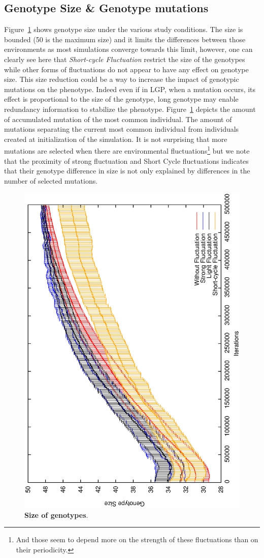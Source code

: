 \subsection{Genotype Size \& Genotype mutations}
Figure~\ref{fig:Size} shows genotype size under the various study conditions. The size is bounded (50 is the maximum size) and it limits the differences between those environments as most simulations converge towards this limit, however, one can clearly see here that \emph{Short-cycle Fluctuation} restrict the size of the genotypes while other forms of fluctuations do not appear to have any effect on genotype size. This size reduction could be a way to increase the impact of genotypic mutations on the phenotype. Indeed even if in LGP, when a mutation occurs, its effect is proportional to the size of the genotype, long genotype may enable redundancy information to stabilize the phenotype. Figure~\ref{fig:Size} depicts the amount of accumulated mutation of the most common individual. The amount of mutations separating the current most common individual from individuals created at initialization of the simulation. It is not surprising that more mutations are selected when there are environmental fluctuations\footnote{And those seem to depend more on the strength of these fluctuations than on their periodicity.} but we note that the proximity of strong fluctuation and Short Cycle fluctuations indicates that their genotype difference in size is not only explained by differences in the number of selected mutations.


\begin{figure}[h]
\centering
\includegraphics[width=0.7\columnwidth, angle =-90 ]{img/Size}
\caption{\textbf{Size of genotypes}. 
}
\label{fig:Size}
\end{figure}

